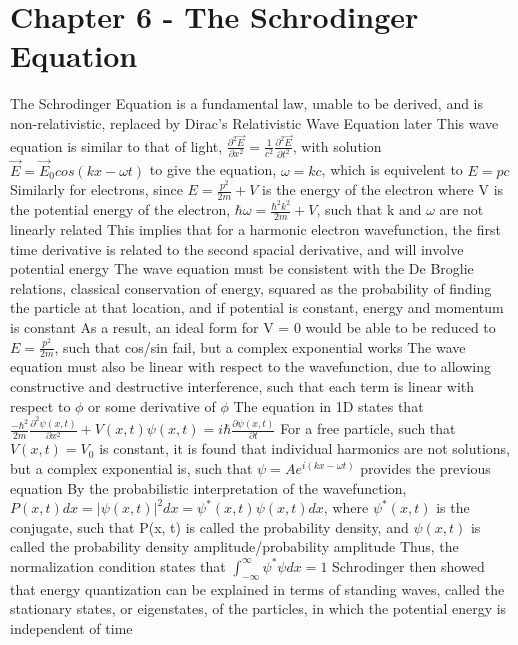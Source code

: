 \documentclass[11 pt, twoside]{article}
\newenvironment{outline*}
{
	\begin{outline}[enumerate]
	}
	{\end{outline}
}
\begin{document}
\section{Chapter 6 - The Schrodinger Equation}
\begin{outline*}
\1 The Schrodinger Equation is a fundamental law, unable to be derived, and is non-relativistic, replaced by Dirac's Relativistic Wave Equation later
	\2 This wave equation is similar to that of light, $\frac{\partial^2\vec{E}}{\partial x^2} = \frac{1}{c^2}\frac{\partial^2\vec{E}}{\partial t^2}$, with solution $\vec{E} = \vec{E}_0 cos(kx - \omega t)$ to give the equation, $\omega = kc$, which is equivelent to $E = pc$
		\3 Similarly for electrons, since $E = \frac{p^2}{2m} + V$ is the energy of the electron where V is the potential energy of the electron, $\hbar \omega = \frac{\hbar^2 k^2}{2m} + V$, such that k and $\omega$ are not linearly related
		\3 This implies that for a harmonic electron wavefunction, the first time derivative is related to the second spacial derivative, and will involve potential energy
		\3 The wave equation must be consistent with the De Broglie relations, classical conservation of energy, squared as the probability of finding the particle at that location, and if potential is constant, energy and momentum is constant
			\4 As a result, an ideal form for V = 0 would be able to be reduced to $E = \frac{p^2}{2m}$, such that cos/sin fail, but a complex exponential works
		\3 The wave equation must also be linear with respect to the wavefunction, due to allowing constructive and destructive interference, such that each term is linear with respect to $\phi$ or some derivative of $\phi$
	\2 The equation in 1D states that $\frac{-\hbar^2}{2m} \frac{\partial^2\psi(x, t)}{\partial x^2} + V(x, t)\psi(x, t) = i\hbar \frac{\partial \psi(x, t)}{\partial t}$
		\3 For a free particle, such that $V(x, t) = V_0$ is constant, it is found that individual harmonics are not solutions, but a complex exponential is, such that $\psi = Ae^{i(kx - \omega t)}$ provides the previous equation
	\2 By the probabilistic interpretation of the wavefunction, $P(x, t)dx = |\psi(x, t)|^2dx = \psi^*(x, t)\psi(x, t)dx$, where $\psi^*(x, t)$ is the conjugate, such that P(x, t) is called the probability density, and $\psi(x, t)$ is called the probability density amplitude/probability amplitude
		\3 Thus, the normalization condition states that $\int^{\infty}_{-\infty} \psi^* \psi dx = 1$
	\2 Schrodinger then showed that energy quantization can be explained in terms of standing waves, called the stationary states, or eigenstates, of the particles, in which the potential energy is independent of time

\end{outline*}
\end{document}
